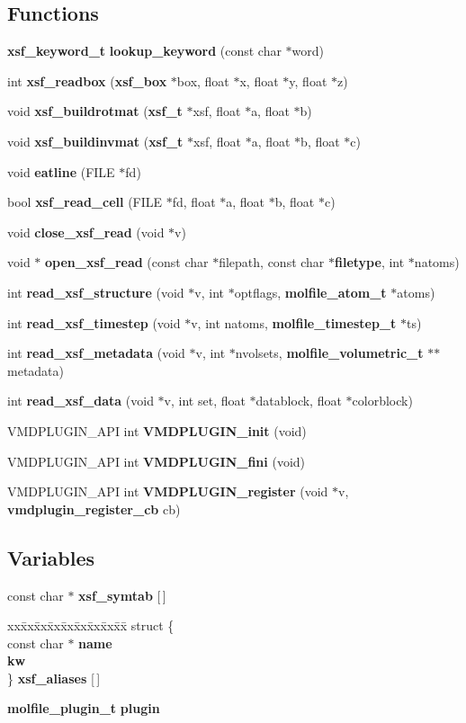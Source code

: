 \subsection*{Functions}
\begin{CompactItemize}
\item 
{\bf xsf\_\-keyword\_\-t} {\bf lookup\_\-keyword} (const char $\ast$word)
\item 
int {\bf xsf\_\-readbox} ({\bf xsf\_\-box} $\ast$box, float $\ast$x, float $\ast$y, float $\ast$z)
\item 
void {\bf xsf\_\-buildrotmat} ({\bf xsf\_\-t} $\ast$xsf, float $\ast$a, float $\ast$b)
\item 
void {\bf xsf\_\-buildinvmat} ({\bf xsf\_\-t} $\ast$xsf, float $\ast$a, float $\ast$b, float $\ast$c)
\item 
void {\bf eatline} (FILE $\ast$fd)
\item 
bool {\bf xsf\_\-read\_\-cell} (FILE $\ast$fd, float $\ast$a, float $\ast$b, float $\ast$c)
\item 
void {\bf close\_\-xsf\_\-read} (void $\ast$v)
\item 
void $\ast$ {\bf open\_\-xsf\_\-read} (const char $\ast$filepath, const char $\ast${\bf filetype}, int $\ast$natoms)
\item 
int {\bf read\_\-xsf\_\-structure} (void $\ast$v, int $\ast$optflags, {\bf molfile\_\-atom\_\-t} $\ast$atoms)
\item 
int {\bf read\_\-xsf\_\-timestep} (void $\ast$v, int natoms, {\bf molfile\_\-timestep\_\-t} $\ast$ts)
\item 
int {\bf read\_\-xsf\_\-metadata} (void $\ast$v, int $\ast$nvolsets, {\bf molfile\_\-volumetric\_\-t} $\ast$$\ast$metadata)
\item 
int {\bf read\_\-xsf\_\-data} (void $\ast$v, int set, float $\ast$datablock, float $\ast$colorblock)
\item 
VMDPLUGIN\_\-API int {\bf VMDPLUGIN\_\-init} (void)
\item 
VMDPLUGIN\_\-API int {\bf VMDPLUGIN\_\-fini} (void)
\item 
VMDPLUGIN\_\-API int {\bf VMDPLUGIN\_\-register} (void $\ast$v, {\bf vmdplugin\_\-register\_\-cb} cb)
\end{CompactItemize}
\subsection*{Variables}
\begin{CompactItemize}
\item 
const char $\ast$ {\bf xsf\_\-symtab} [$\,$]
\item 
\begin{tabbing}
xx\=xx\=xx\=xx\=xx\=xx\=xx\=xx\=xx\=\kill
struct \{\\
\>const char $\ast$ {\bf name}\\
 {\bf kw}\\
\} {\bf xsf\_aliases} [$\,$]
\end{tabbing}
\item 
{\bf molfile\_\-plugin\_\-t} {\bf plugin}
\end{CompactItemize}



